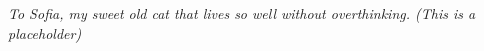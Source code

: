 \thispagestyle{empty}
\begin{flushright}
    \emph{To Sofia, my sweet old cat that lives so well without overthinking. (This is a placeholder)}
\end{flushright}

